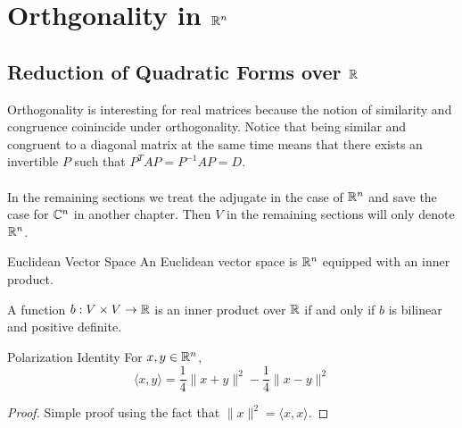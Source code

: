 \documentclass[a4paper]{article}
\begin{document}
\pagebreak
\section{Orthgonality in $\mathbb{R}^n$}
\subsection{Reduction of Quadratic Forms over $\mathbb{R}$}
Orthogonality is interesting for real matrices because the notion of similarity and congruence coinincide under orthogonality. Notice that being similar and congruent to a diagonal matrix at the same time means that there exists an invertible $P$ such that $P^TAP=P^{-1}AP=D$. \\~\\

In the remaining sections we treat the adjugate in the case of $\mathbb{R}^n$ and save the case for $\mathbb{C}^n$ in another chapter. Then $V$ in the remaining sections will only denote $\mathbb{R}^n$. 

\begin{defn}{Euclidean Vector Space}{} An Euclidean vector space is $\mathbb{R}^n$ equipped with an inner product. 
\end{defn}

\begin{prp}{}{} A function $b:V\times V\to\mathbb{R}$ is an inner product over $\mathbb{R}$ if and only if $b$ is bilinear and positive definite. 
\end{prp}

\begin{lmm}{Polarization Identity}{} For $x,y\in\mathbb{R}^n$, $$\langle x,y\rangle=\frac{1}{4}\|x+y\|^2-\frac{1}{4}\|x-y\|^2$$\tcbline
\begin{proof} Simple proof using the fact that $\|x\|^2=\langle x,x\rangle$. 
\end{proof}
\end{lmm}
\end{document}
